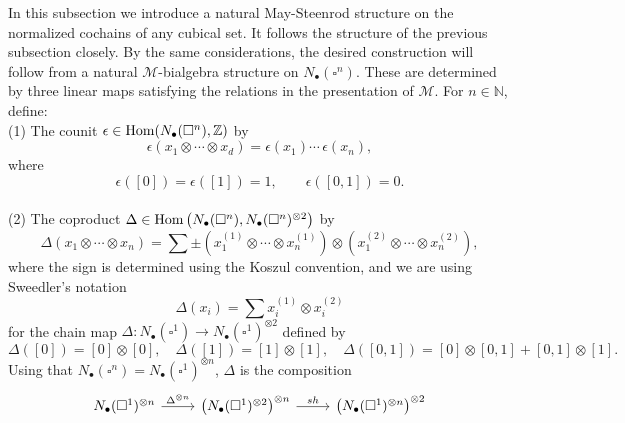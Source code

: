 In this subsection we introduce a natural May-Steenrod structure on the normalized cochains of any cubical set. It follows the structure of the previous subsection closely. By the same considerations, the desired construction will follow from a natural $\mathcal M$-bialgebra structure on $N_\bullet(\square^n)$. These are determined by three linear maps satisfying the relations in the presentation of $\mathcal M$. For $n \in \mathbb{N}$, define: \vspace*{5pt} \\
(1) The counit $\epsilon \in \mathrm{Hom}(N_\bullet(\square^n), \mathbb{Z})$ by
\begin{equation*}
\epsilon \left( x_1 \otimes \cdots \otimes x_d \right) = \epsilon(x_1) \cdots \, \epsilon(x_n),
\end{equation*}
where
\begin{equation*}
\epsilon([0]) = \epsilon([1]) = 1, \qquad \epsilon([0, 1]) = 0.
\end{equation*} \vspace*{-6pt} \\
(2) The coproduct $\Delta \in \mathrm{Hom} \left( N_\bullet(\square^n), N_\bullet(\square^n)^{\otimes 2} \right)$ by
\begin{equation*}	
\Delta (x_1 \otimes \cdots \otimes x_n) = 	
\sum \pm \left( x_1^{(1)} \otimes \cdots \otimes x_n^{(1)} \right) \otimes 	
\left( x_1^{(2)} \otimes \cdots \otimes x_n^{(2)} \right),	
\end{equation*}	
where the sign is determined using the Koszul convention, and we are using Sweedler's notation
\begin{equation*}	
\Delta(x_i) = \sum x_i^{(1)} \otimes x_i^{(2)}
\end{equation*}
for the chain map $\Delta \colon N_\bullet(\square^1) \to N_\bullet(\square^1)^{\otimes 2}$ defined by
\begin{equation*}
\Delta([0]) = [0] \otimes [0], \quad \Delta([1]) = [1] \otimes [1], \quad \Delta([0, 1]) = [0] \otimes [0, 1] + [0, 1] \otimes [1].
\end{equation*}
Using that $N_\bullet(\square^n) = N_\bullet(\square^1)^{\otimes n}$, $\Delta$ is the composition
\begin{equation*}
\begin{tikzcd}
N_\bullet(\square^1)^{\otimes n} \arrow[r, "\Delta^{\otimes n}"] & \left( N_\bullet(\square^1)^{\otimes 2}  \right)^{\otimes n} \arrow[r, "sh"] & \left( N_\bullet(\square^1)^{\otimes n} \right)^{\otimes 2}
\end{tikzcd}
\end{equation*}
